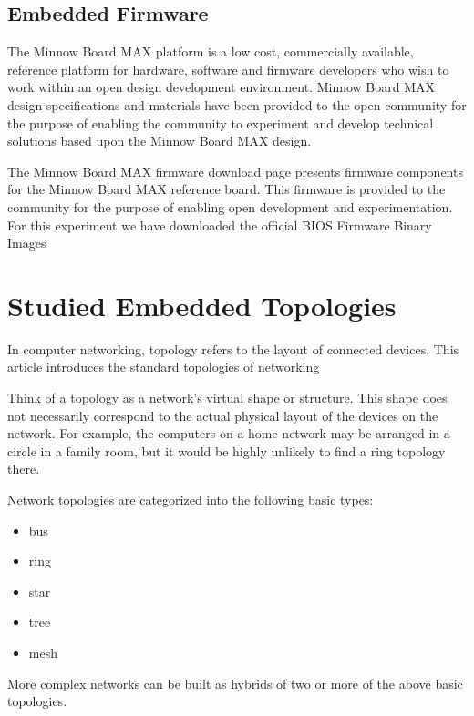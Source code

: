 \subsection{Embedded Firmware}

The Minnow Board MAX platform is a low cost, commercially available, reference
platform for hardware, software and firmware developers who wish to work within
an open design development environment. Minnow Board MAX design specifications
and materials have been provided to the open community for the purpose of
enabling the community to experiment and develop technical solutions based upon
the Minnow Board MAX design.

The Minnow Board MAX firmware download page presents firmware components for the
Minnow Board MAX reference board. This firmware is provided to the community for
the purpose of enabling open development and experimentation. For this
experiment we have downloaded the official BIOS Firmware Binary Images
\cite{minnowmax-firmware}

\section{Studied Embedded Topologies}

In computer networking, topology refers to the layout of connected devices. This
article introduces the standard topologies of networking

Think of a topology as a network's virtual shape or structure. This shape does
not necessarily correspond to the actual physical layout of the devices on the
network. For example, the computers on a home network may be arranged in a
circle in a family room, but it would be highly unlikely to find a ring
topology there.

Network topologies are categorized into the following basic types:

\begin{itemize}
    \item bus
    \item ring
    \item star
    \item tree
    \item mesh
\end{itemize}

More complex networks can be built as hybrids of two or more of the above basic
topologies.

